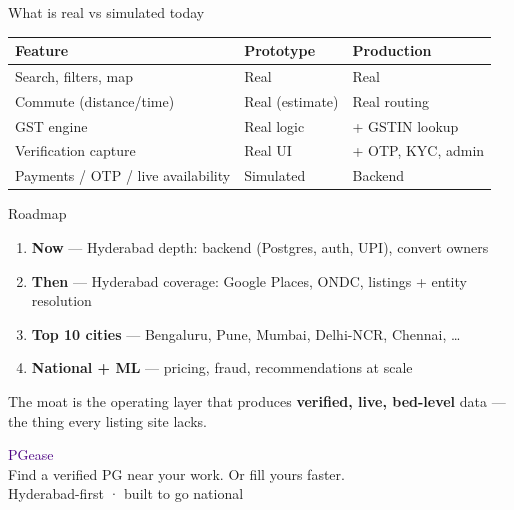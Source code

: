 \documentclass[aspectratio=169]{beamer}
\begin{document}
\begin{frame}{What is real vs simulated today}
  \begin{table}
    \small
    \begin{tabular}{lll}
      \toprule
      Feature & Prototype & Production \\
      \midrule
      Search, filters, map & \textcolor{emerald}{Real} & Real \\
      Commute (distance/time) & \textcolor{emerald}{Real (estimate)} & Real routing \\
      GST engine & \textcolor{emerald}{Real logic} & + GSTIN lookup \\
      Verification capture & \textcolor{emerald}{Real UI} & + OTP, KYC, admin \\
      Payments / OTP / live availability & \textcolor{amber}{Simulated} & Backend \\
      \bottomrule
    \end{tabular}
  \end{table}
\end{frame}

\begin{frame}{Roadmap}
  \begin{enumerate}
    \item \textbf{Now} — Hyderabad depth: backend (Postgres, auth, UPI), convert owners
    \item \textbf{Then} — Hyderabad coverage: Google Places, ONDC, listings + entity resolution
    \item \textbf{Top 10 cities} — Bengaluru, Pune, Mumbai, Delhi-NCR, Chennai, \dots
    \item \textbf{National + ML} — pricing, fraud, recommendations at scale
  \end{enumerate}
  \vspace{0.3cm}
  \begin{block}{}
    The moat is the operating layer that produces \textbf{verified, live, bed-level} data —
    the thing every listing site lacks.
  \end{block}
\end{frame}

\begin{frame}
  \begin{center}
    \Huge \textcolor{indigo}{PGease}\\[0.3cm]
    \Large Find a verified PG near your work. Or fill yours faster.\\[0.6cm]
    \small Hyderabad-first · built to go national
  \end{center}
\end{frame}
\end{document}
